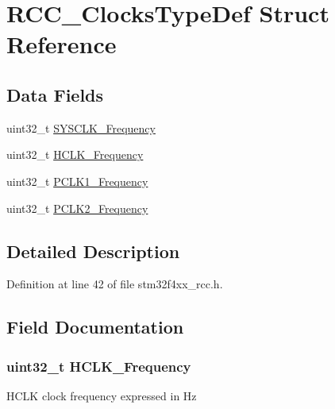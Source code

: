 \hypertarget{struct_r_c_c___clocks_type_def}{\section{R\-C\-C\-\_\-\-Clocks\-Type\-Def Struct Reference}
\label{struct_r_c_c___clocks_type_def}
}
\subsection*{Data Fields}
\begin{DoxyCompactItemize}
\item 
uint32\-\_\-t \hyperlink{struct_r_c_c___clocks_type_def_a48b5f04759728e39921969e75c4899e8}{S\-Y\-S\-C\-L\-K\-\_\-\-Frequency}
\item 
uint32\-\_\-t \hyperlink{struct_r_c_c___clocks_type_def_a5f9bf60f522a160aa7a878acf92ce129}{H\-C\-L\-K\-\_\-\-Frequency}
\item 
uint32\-\_\-t \hyperlink{struct_r_c_c___clocks_type_def_a9045b24904bde572d479e85c6d2801f6}{P\-C\-L\-K1\-\_\-\-Frequency}
\item 
uint32\-\_\-t \hyperlink{struct_r_c_c___clocks_type_def_a45ada83b2d388a60ed994451f260f389}{P\-C\-L\-K2\-\_\-\-Frequency}
\end{DoxyCompactItemize}


\subsection{Detailed Description}


Definition at line 42 of file stm32f4xx\-\_\-rcc.\-h.



\subsection{Field Documentation}
\hypertarget{struct_r_c_c___clocks_type_def_a5f9bf60f522a160aa7a878acf92ce129}{
\subsubsection[{H\-C\-L\-K\-\_\-\-Frequency}]{\setlength{\rightskip}{0pt plus 5cm}uint32\-\_\-t H\-C\-L\-K\-\_\-\-Frequency}}\label{struct_r_c_c___clocks_type_def_a5f9bf60f522a160aa7a878acf92ce129}
H\-C\-L\-K clock frequency expressed in Hz 


